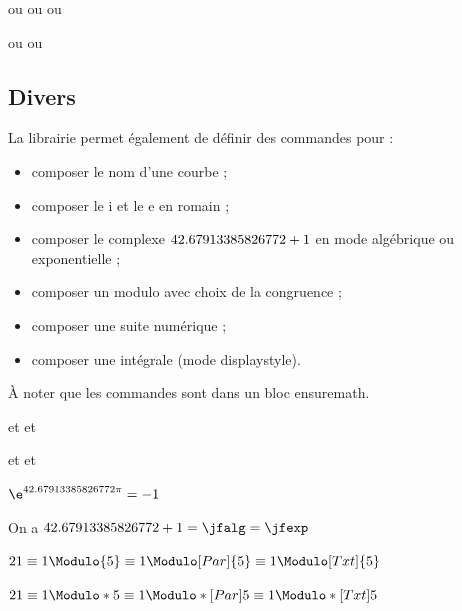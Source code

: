 \documentclass[a4paper,french,11pt]{article}
\newcommand\clib[1]{%
	{\tcbox[vignettelib]{#1}\xspace}%
}
\begin{document}
\begin{PresCodeTexPL}{}
 ou  ou  ou 

 ou  ou 
\end{PresCodeTexPL}

\subsection{Divers}

\begin{tipblock}
La librairie \clib{ecritures} permet également de définir des commandes pour :

\begin{itemize}
	\item composer le nom d'une courbe ;
	\item composer le \og i \fg{} et le \og e \fg{} en romain ;
	\item composer le complexe $\j$ en mode algébrique ou exponentielle ;
	\item composer un modulo avec choix de la congruence ;
	\item composer une suite numérique ;
	\item composer une intégrale (mode \textsf{displaystyle}).
\end{itemize}

À noter que les commandes sont dans un bloc \textsf{ensuremath}.
\end{tipblock}

\begin{PresCodeTexPL}{}

\Courbe et \Courbe[f] et \Courbe[g^{-1}]

\Courbe* et \Courbe*[f] et \Courbe*[g^{-1}]
\end{PresCodeTexPL}

\begin{PresCodeTexPL}{}
$\e^{\i \pi} = -1$
\end{PresCodeTexPL}

\begin{PresCodeTexPL}{}
On a $\j = \jfalg = \jfexp$
\end{PresCodeTexPL}

\begin{PresCodeTexPL}{}
$21 \equiv 1 \Modulo{5} \equiv 1 \Modulo[Par]{5} \equiv 1 \Modulo[Txt]{5}$

$21 \equiv 1 \Modulo*{5} \equiv 1 \Modulo*[Par]{5} \equiv 1 \Modulo*[Txt]{5}$
\end{PresCodeTexPL}
\end{document}
